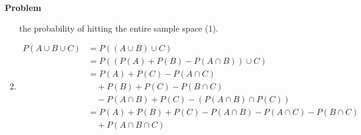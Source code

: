 \documentclass[12pt]{article}
\newenvironment{Ex}{\textbf{Problem}\vspace{.75em}\\}{}
\begin{document}
\begin{enumerate}
\begin{Ex}
\begin{solution}
\begin{enumerate}
        the probability of hitting the entire sample space (1).
      \item
        \begin{equation*}
          \begin{aligned}
            P(A \cup B \cup C) &= P((A \cup B) \cup C) \\
            &= P((P(A) + P(B) - P(A \cap B)) \cup C) \\
            &= P(A) + P(C) - P(A \cap C) \\
            &\quad + P(B) + P(C) - P(B \cap C) \\
            &\quad - P(A \cap B) + P(C) - (P(A \cap B) \cap P(C)) \\
            &= P(A) + P(B) + P(C) - P(A \cap B) - P(A \cap C) - P(B
            \cap C) \\
            &\quad + P(A \cap B \cap C)
          \end{aligned}
        \end{equation*}


\end{enumerate}
\end{solution}
\end{Ex}
\end{enumerate}
\end{document}
